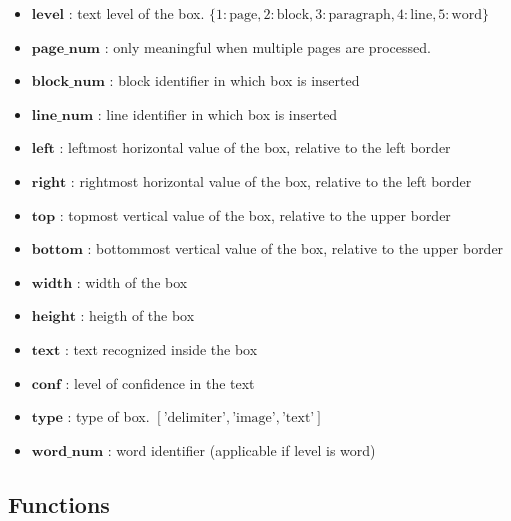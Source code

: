 \documentclass{article}
\begin{document}
\begin{itemize}
    \item $\mathbf{level}$ : text level of the box. $\{ 1:\text{page}, 2:\text{block}, 3:\text{paragraph}, 4:\text{line}, 5:\text{word} \}$

    \item $\mathbf{page\_num}$ : only meaningful when multiple pages are processed.

    \item $\mathbf{block\_num}$ : block identifier in which box is inserted

    \item $\mathbf{line\_num}$ : line identifier in which box is inserted

    \item $\mathbf{left}$ : leftmost horizontal value of the box, relative to the left border

    \item $\mathbf{right}$ : rightmost horizontal value of the box, relative to the left border

    \item $\mathbf{top}$ : topmost vertical value of the box, relative to the upper border

    \item $\mathbf{bottom}$ : bottommost vertical value of the box, relative to the upper border

    \item $\mathbf{width}$ : width of the box

    \item $\mathbf{height}$ : heigth of the box

    \item $\mathbf{text}$ : text recognized inside the box

    \item $\mathbf{conf}$ : level of confidence in the text

    \item $\mathbf{type}$ : type of box. $[\text{'delimiter'},\text{'image'},\text{'text'}]$

    \item $\mathbf{word\_num}$ : word identifier (applicable if level is word)
\end{itemize}


\subsection{Functions}
\end{document}
